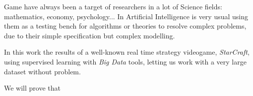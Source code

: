 Game have always been a target of researchers in a lot of Science fields:
mathematics, economy, psychology... In Artificial Intelligence is very usual
using them as a testing bench for algorithms or theories to resolve complex
problems, due to their simple specification but complex modelling.

In this work the results of a well-known real time strategy videogame,
\emph{StarCraft}, using supervised learning with \emph{Big Data} tools,
letting us work with a very large dataset without problem.

We will prove that 
